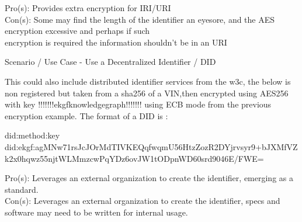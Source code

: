 Pro(s): Provides extra encryption for IRI/URI \\
Con(s): Some may find the length of the identifier an eyesore, and the AES encryption excessive and perhaps if such \\
encryption is required the information shouldn’t be in an URI

Scenario / Use Case -
Use a Decentralized Identifier / DID

This could also include distributed identifier services from the w3c, the below is non registered but taken
from a sha256 of a VIN,then encrypted using AES256 with key !!!!!!!ekgfknowledgegraph!!!!!!! using ECB mode from the
previous encryption example.
The format of a DID is :

did:method:key \\
{\footnotesize did:ekgf:agMNw71rsJcJOrMdTIVKEQqfwqmU56HtzZozR2DYjrvsyr9+bJXMfVZk2x0hqwz55njtWLMmzcwPqYDz6ovJW1tODpnWD60srd9046E/FWE= }

Pro(s): Leverages an external organization to create the identifier, emerging as a standard. \\
Con(s): Leverages an external organization to create the identifier, specs and software may need to be written for
internal usage.
